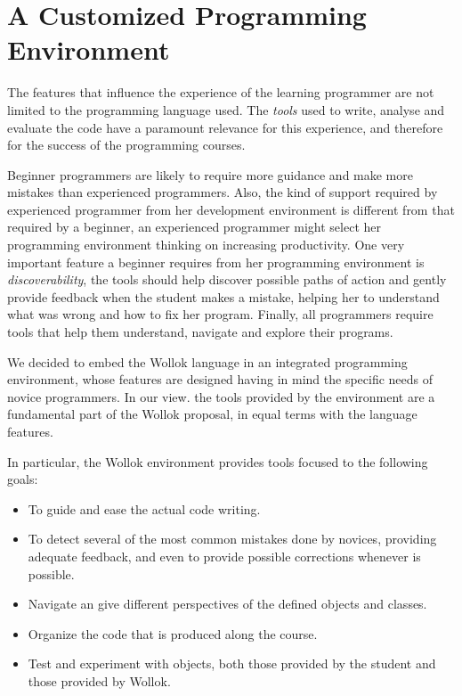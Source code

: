\section{A Customized Programming Environment}
\label{sec:environment}


The features that influence the experience of the learning programmer are not limited to the programming language used. 
The \emph{tools} used to write, analyse and evaluate the code have a paramount relevance for this experience, and therefore for the success of the programming courses.

Beginner programmers are likely to require more guidance and make more mistakes than experienced programmers.
Also, the kind of support required by experienced programmer from her development environment is different from that required by a beginner, \eg an experienced programmer might select her programming environment thinking on increasing productivity.
One very important feature a beginner requires from her programming environment is \emph{discoverability}, \ie the tools should help discover possible paths of action and gently provide feedback when the student makes a mistake, helping her to understand what was wrong and how to fix her program.
Finally, all programmers require tools that help them understand, navigate and explore their programs.

\medskip 

We decided to embed the Wollok language in an integrated programming environment, whose features are designed having in mind the specific needs of novice programmers.
In our view. the tools provided by the environment are a fundamental part of the Wollok proposal, in equal terms with the language features.

In particular, the Wollok environment provides tools focused to the following goals:
\begin{itemize}
\item To guide and ease the actual code writing.
\item To detect several of the most common mistakes done by novices, providing adequate feedback, and even to provide possible corrections whenever is possible.
\item Navigate an give different perspectives of the defined objects and classes.
\item Organize the code that is produced along the course.
\item Test and experiment with objects, both those provided by the student and those provided by Wollok.
\end{itemize}

